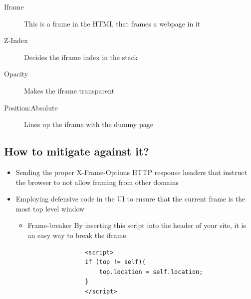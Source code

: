 \documentclass[a4paper, titlepage]{article}
\begin{document}
\begin{description}
    \item[Iframe] This is a frame in the HTML that frames a webpage in it
    \item[Z-Index] Decides the iframe index in the stack
    \item[Opacity] Makes the iframe transparent
    \item[Position:Absolute] Lines up the iframe with the dummy page
\end{description}

\subsection{How to mitigate against it?}

\begin{itemize}
    \item Sending the proper X-Frame-Options HTTP response headers that instruct the browser to not allow framing from other domains
    \item Employing defensive code in the UI to ensure that the current frame is the most top level window
        \begin{itemize}
            \item Frame-breaker
                By inserting this script into the header of your site, it is an easy way to break the iframe.

                \begin{lstlisting}
                <script>
                if (top != self){
                    top.location = self.location;
                }
                </script>
                \end{lstlisting}
        \end{itemize}
\end{itemize}
\newpage
\end{document}
